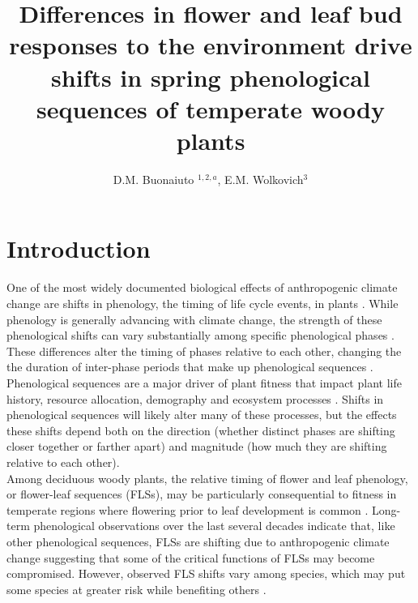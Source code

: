 \documentclass[11pt]{article}
\title{Differences in flower and leaf bud responses to the environment drive shifts in spring phenological sequences of temperate woody plants}\\
\date{}
\author{D.M. Buonaiuto $^{1,2,a}$, E.M. Wolkovich$^{3}$}
\begin{document}
\maketitle
\section*{Introduction}
One of the most widely documented biological effects of anthropogenic climate change are shifts in phenology, the timing of life cycle events, in plants \citep{}. While phenology is generally advancing with climate change, the strength of these phenological shifts can vary substantially among specific phenological phases \citep{}. These differences alter the timing of phases relative to each other, changing the the duration of inter-phase periods that make up phenological sequences \citep{}. Phenological sequences are a major driver of plant fitness that impact plant life history, resource allocation, demography and ecosystem processes \citep{}. Shifts in phenological sequences will likely alter many of these processes, but the effects these shifts depend both on the direction (whether distinct phases are shifting closer together or farther apart) and magnitude (how much they are shifting relative to each other).\\ %

Among deciduous woody plants, the relative timing of flower and leaf phenology, or flower-leaf sequences (FLSs), may be particularly consequential to fitness in temperate regions where flowering prior to leaf development is common \citep{Rathcke_1985,Gougherty2018}. Long-term phenological observations over the last several decades indicate that, like other phenological sequences, FLSs are shifting due to anthropogenic climate change \citep{Buonaiuto2020} suggesting that some of the critical functions of FLSs may become compromised. However, observed FLS shifts vary among species, which may put some species at greater risk while benefiting others \citep{Buonaiuto2020}.\\  %
\end{document}

